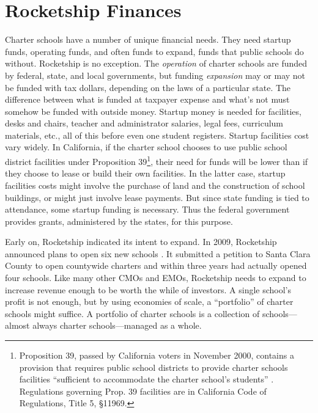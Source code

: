 \section{Rocketship Finances}\label{sec:rocketship-finances}\indent

Charter schools have a number of unique financial needs. They need startup funds, operating funds, and often funds to expand, funds that public schools do without. Rocketship is no exception. The \textit{operation} of charter schools are funded by federal, state, and local governments, but funding \textit{expansion} may or may not be funded with tax dollars, depending on the laws of a particular state. The difference between what is funded at taxpayer expense and what's not must somehow be funded with outside money. Startup money is needed for facilities, desks and chairs, teacher and administrator salaries, legal fees, curriculum materials, etc., all of this before even one student registers. Startup facilities cost vary widely. In California, if the charter school chooses to use public school district facilities under Proposition 39\footnote{Proposition 39, passed by California voters in November 2000, contains a provision that requires public school districts to provide charter schools facilities ``sufficient to accommodate the charter school’s students'' \parencite[38—41]{sos.ca2000} \parencite{Prop39.2000}. Regulations governing Prop. 39 facilities are in California Code of Regulations, Title 5, §11969.}, their need for funds will be lower than if they choose to lease or build their own facilities. In the latter case, startup facilities costs might involve the purchase of land and the construction of school buildings, or might just involve lease payments. But since state funding is tied to attendance, some startup funding is necessary. Thus the federal government provides grants, administered by the states, for this purpose.

Early on, Rocketship indicated its intent to expand. In 2009, Rocketship announced plans to open six new schools \parencite{Cook2009}. It submitted a petition to Santa Clara County to open countywide charters and within three years had actually opened four schools. Like many other CMOs and EMOs, Rocketship needs to expand to increase revenue enough to be worth the while of investors. A single school's profit is not enough, but by using economies of scale, a ``portfolio'' of charter schools might suffice. A portfolio of charter schools is a collection of schools—almost always charter schools—managed as a whole.

